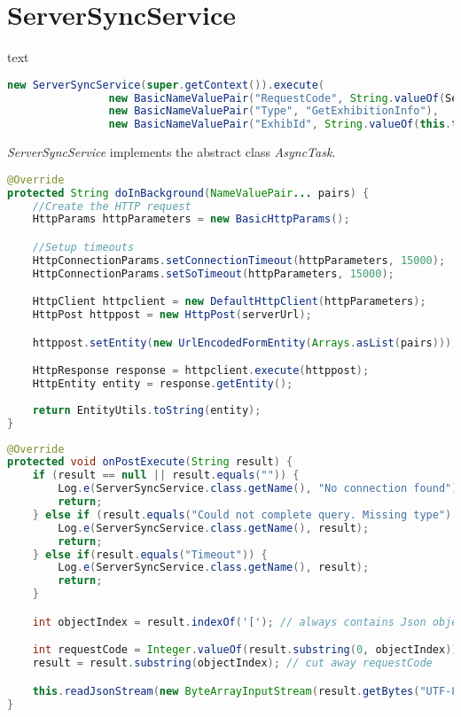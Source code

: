 \section{ServerSyncService}
text\todo{}

\begin{lstlisting}[language=java, label=lst:serverrequest, caption={Get exhibition information request}]
new ServerSyncService(super.getContext()).execute(
                new BasicNameValuePair("RequestCode", String.valueOf(ServerSyncService.GET_EXHIBITION_INFO)),
                new BasicNameValuePair("Type", "GetExhibitionInfo"),
                new BasicNameValuePair("ExhibId", String.valueOf(this.tabActivity.getExhibId());
\end{lstlisting}

\textit{ServerSyncService} implements the abstract class \textit{AsyncTask}.\todo{}

\begin{lstlisting}[language=java, label=lst:doinbackground, caption={The async abstract method \textit{doInBackground}}]
@Override
protected String doInBackground(NameValuePair... pairs) {
    //Create the HTTP request
    HttpParams httpParameters = new BasicHttpParams();

    //Setup timeouts
    HttpConnectionParams.setConnectionTimeout(httpParameters, 15000);
    HttpConnectionParams.setSoTimeout(httpParameters, 15000);

    HttpClient httpclient = new DefaultHttpClient(httpParameters);
    HttpPost httppost = new HttpPost(serverUrl);

    httppost.setEntity(new UrlEncodedFormEntity(Arrays.asList(pairs)));

    HttpResponse response = httpclient.execute(httppost);
    HttpEntity entity = response.getEntity();
    
    return EntityUtils.toString(entity);
}
\end{lstlisting}

\begin{lstlisting}[language=java, label=lst:onpostexecute, caption={The async method \textit{onPostExecute}}]
@Override
protected void onPostExecute(String result) {
    if (result == null || result.equals("")) {
        Log.e(ServerSyncService.class.getName(), "No connection found");
        return;
    } else if (result.equals("Could not complete query. Missing type") || result.equals("Missing request code!")) {
        Log.e(ServerSyncService.class.getName(), result);
        return;
    } else if(result.equals("Timeout")) {
        Log.e(ServerSyncService.class.getName(), result);
        return;
    }

    int objectIndex = result.indexOf('['); // always contains Json object

    int requestCode = Integer.valueOf(result.substring(0, objectIndex));
    result = result.substring(objectIndex); // cut away requestCode

    this.readJsonStream(new ByteArrayInputStream(result.getBytes("UTF-8")), requestCode);
}
\end{lstlisting}